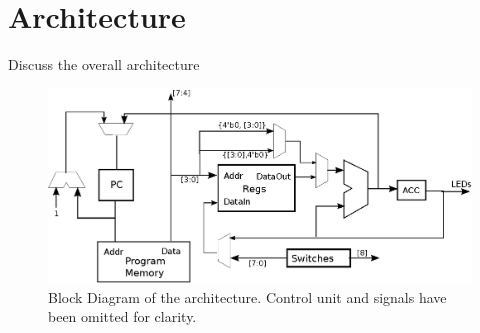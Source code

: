
\section{Architecture}

Discuss the overall architecture


\begin{figure}
\includegraphics[width=\textwidth]{Figures/architecture.eps}
\caption{Block Diagram of the architecture. Control unit and signals have been omitted for clarity.}
\label{fig:arch}
\end{figure}

